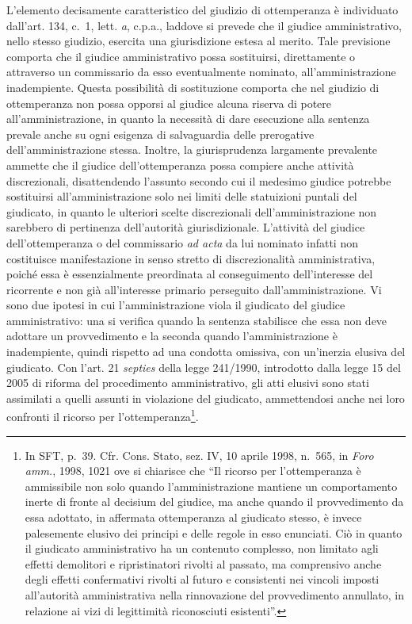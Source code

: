 \documentclass[12pt,it,a4paper,]{report}
\begin{document}
L'elemento decisamente caratteristico del giudizio di ottemperanza è
individuato dall'art. 134, c.~1, lett. \emph{a}, c.p.a., laddove si
prevede che il giudice amministrativo, nello stesso giudizio, esercita
una giurisdizione estesa al merito. Tale previsione comporta che il
giudice amministrativo possa sostituirsi, direttamente o attraverso un
commissario da esso eventualmente nominato, all'amministrazione
inadempiente. Questa possibilità di sostituzione comporta che nel
giudizio di ottemperanza non possa opporsi al giudice alcuna riserva di
potere all'amministrazione, in quanto la necessità di dare esecuzione
alla sentenza prevale anche su ogni esigenza di salvaguardia delle
prerogative dell'amministrazione stessa. Inoltre, la giurisprudenza
largamente prevalente ammette che il giudice dell'ottemperanza possa
compiere anche attività discrezionali, disattendendo l'assunto secondo
cui il medesimo giudice potrebbe sostituirsi all'amministrazione solo
nei limiti delle statuizioni puntali del giudicato, in quanto le
ulteriori scelte discrezionali dell'amministrazione non sarebbero di
pertinenza dell'autorità giurisdizionale. L'attività del giudice
dell'ottemperanza o del commissario \emph{ad acta} da lui nominato
infatti non costituisce manifestazione in senso stretto di
discrezionalità amministrativa, poiché essa è essenzialmente preordinata
al conseguimento dell'interesse del ricorrente e non già all'interesse
primario perseguito dall'amministrazione. Vi sono due ipotesi in cui
l'amministrazione viola il giudicato del giudice amministrativo: una si
verifica quando la sentenza stabilisce che essa non deve adottare un
provvedimento e la seconda quando l'amministrazione è inadempiente,
quindi rispetto ad una condotta omissiva, con un'inerzia elusiva del
giudicato. Con l'art. 21 \emph{septies} della legge 241/1990, introdotto
dalla legge 15 del 2005 di riforma del procedimento amministrativo, gli
atti elusivi sono stati assimilati a quelli assunti in violazione del
giudicato, ammettendosi anche nei loro confronti il ricorso per
l'ottemperanza\footnote{In SFT, p.~39. Cfr. Cons. Stato, sez. IV, 10
  aprile 1998, n.~565, in \emph{Foro amm.}, 1998, 1021 ove si chiarisce
  che ``Il ricorso per l'ottemperanza è ammissibile non solo quando
  l'amministrazione mantiene un comportamento inerte di fronte al
  decisium del giudice, ma anche quando il provvedimento da essa
  adottato, in affermata ottemperanza al giudicato stesso, è invece
  palesemente elusivo dei principi e delle regole in esso enunciati. Ciò
  in quanto il giudicato amministrativo ha un contenuto complesso, non
  limitato agli effetti demolitori e ripristinatori rivolti al passato,
  ma comprensivo anche degli effetti confermativi rivolti al futuro e
  consistenti nei vincoli imposti all'autorità amministrativa nella
  rinnovazione del provvedimento annullato, in relazione ai vizi di
  legittimità riconosciuti esistenti''.}.
\end{document}
